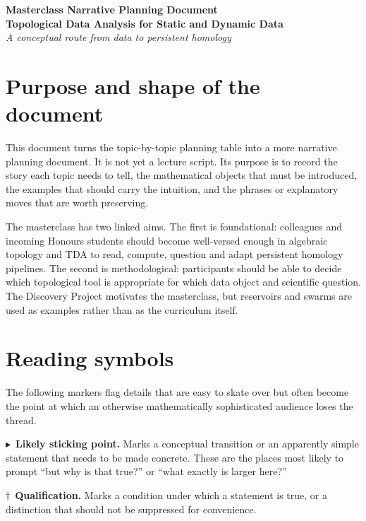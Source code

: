 \documentclass[11pt,a4paper]{article}
\newcommand{\stickingpoint}[1]{%
\par\smallskip
\noindent\textcolor{red!65!black}{\(\blacktriangleright\)\ \textbf{Likely sticking point.}} #1
\par\smallskip
}
\newcommand{\qualification}[1]{%
\par\smallskip
\noindent\textcolor{blue!70!black}{\(\dagger\)\ \textbf{Qualification.}} #1
\par\smallskip
}
\begin{document}
\begin{center}
    {\Large \textbf{Masterclass Narrative Planning Document}}\\[0.4em]
    {\large \textbf{Topological Data Analysis for Static and Dynamic Data}}\\[0.5em]
    \textit{A conceptual route from data to persistent homology}
\end{center}

\tableofcontents

\section*{Purpose and shape of the document}

This document turns the topic-by-topic planning table into a more narrative
planning document. It is not yet a lecture script. Its purpose is to record the
story each topic needs to tell, the mathematical objects that must be introduced,
the examples that should carry the intuition, and the phrases or explanatory
moves that are worth preserving.

The masterclass has two linked aims. The first is foundational: colleagues and
incoming Honours students should become well-versed enough in algebraic topology
and TDA to read, compute, question and adapt persistent homology pipelines. The
second is methodological: participants should be able to decide which
topological tool is appropriate for which data object and scientific question.
The Discovery Project motivates the masterclass, but reservoirs and swarms are
used as examples rather than as the curriculum itself.

\section*{Reading symbols}

The following markers flag details that are easy to skate over but often become
the point at which an otherwise mathematically sophisticated audience loses the
thread.

\stickingpoint{Marks a conceptual transition or an apparently simple statement
that needs to be made concrete. These are the places most likely to prompt
``but why is that true?'' or ``what exactly is larger here?''}

\qualification{Marks a condition under which a statement is true, or a
distinction that should not be suppressed for convenience.}
\end{document}
